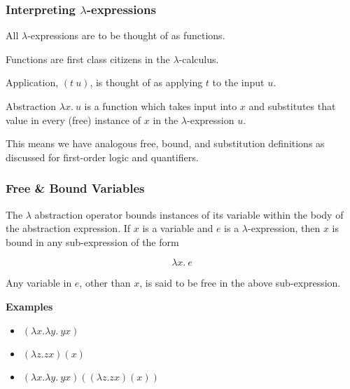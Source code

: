 \documentclass{beamer}
\begin{document}
\begin{frame}
	\frametitle{Interpreting $\lambda$-expressions}

	All $\lambda$-expressions are to be thought of as functions.

	\vspace{0.5cm}

	Functions are first class citizens in the $\lambda$-calculus. 

	\vspace{0.5cm}

	Application, $(t \ u)$, is thought of as applying $t$ to the input $u$.

	\vspace{0.5cm}

	Abstraction $\lambda x. \ u$ is a function which takes input into $x$ and substitutes that value in every (free) instance of $x$ in the $\lambda$-expression $u$.

	\vspace{0.5cm}

	This means we have analogous free, bound, and substitution definitions as discussed for first-order logic and quantifiers. 

\end{frame}

\begin{frame}
	\frametitle{Free \& Bound Variables}

	The $\lambda$ abstraction operator bounds instances of its variable within the body of the abstraction expression. If $x$ is a variable and $e$ is a $\lambda$-expression, then $x$ is bound in any sub-expression of the form 
	
	$$\lambda x. \ e$$

	Any variable in $e$, other than $x$, is said to be free in the above sub-expression.

	\vspace{0.5cm}

	{\bf Examples}

	\begin{itemize}

		\item[] $(\lambda x.\lambda y. \ yx)$ \vspace{0.2cm}

		\item[] $(\lambda z. zx)(x) $ \vspace{0.2cm}

		\item[] $(\lambda x.\lambda y. \ yx)((\lambda z. zx)(x))$
	
	\end{itemize}
	
\end{frame}
\end{document}
